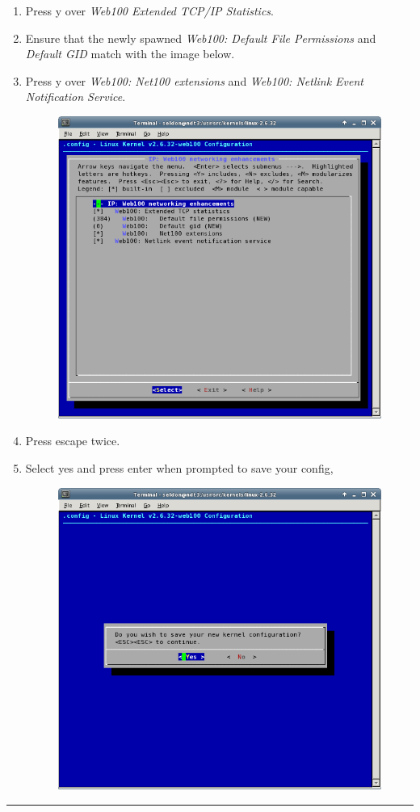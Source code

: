 \begin{enumerate}
\item{Press y over \textit{Web100 Extended TCP/IP Statistics}.}
\item{Ensure that the newly spawned \textit{Web100: Default File Permissions} and \textit{Default GID} match with the image below.}
\item{Press y over \textit{Web100: Net100 extensions} and \textit{Web100: Netlink Event Notification Service}.}

\begin{figure}[H]
\centering
\includegraphics[width=.55\textwidth]{img/menuconfig_05.png}
\end{figure}

\item{Press escape twice.}
\item{Select yes and press enter when prompted to save your config,}

\begin{figure}[H]
\centering
\includegraphics[width=.55\textwidth]{img/menuconfig_06.png}
\end{figure}
\end{enumerate}

\hrule

